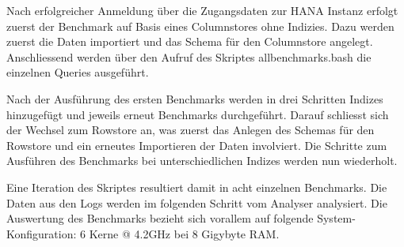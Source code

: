 Nach erfolgreicher Anmeldung über die Zugangsdaten zur HANA Instanz erfolgt zuerst der Benchmark auf Basis eines Columnstores ohne Indizies. Dazu werden zuerst die Daten importiert und das Schema für den Columnstore angelegt. Anschliessend werden über den Aufruf des Skriptes {\glqq}all{\textunderscore}benchmarks.bash{\grqq} die einzelnen Queries ausgeführt. 

Nach der Ausführung des ersten Benchmarks werden in drei Schritten Indizes hinzugefügt und jeweils erneut Benchmarks durchgeführt. Darauf schliesst sich der Wechsel zum Rowstore an, was zuerst das Anlegen des Schemas für den Rowstore und ein erneutes Importieren der Daten involviert. Die Schritte zum Ausführen des Benchmarks bei unterschiedlichen Indizes werden nun wiederholt. 

Eine Iteration des Skriptes resultiert damit in acht einzelnen Benchmarks. Die Daten aus den Logs werden im folgenden Schritt vom Analyser analysiert. Die Auswertung des Benchmarks bezieht sich vorallem auf folgende System-Konfiguration: 6 Kerne @ 4.2GHz bei 8 Gigybyte RAM. 

